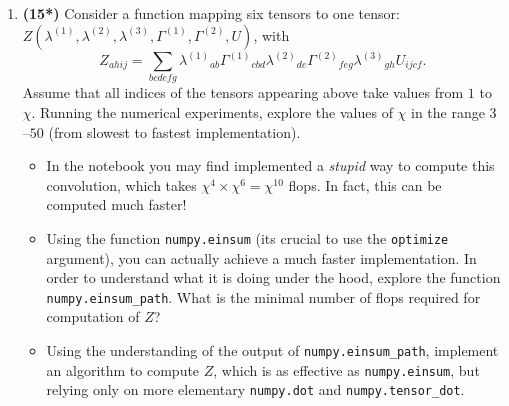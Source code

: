 \begin{enumerate}
\item \textbf{(15*)} Consider a function mapping six tensors to one tensor: $Z\left(\lambda^{(1)},\lambda^{(2)},\lambda^{(3)},\Gamma^{(1)}, \Gamma^{(2)}, U\right)$, with
\begin{equation}
Z_{ahij} = \sum_{bcdefg}\lambda^{(1)}{}_{ab}\Gamma^{(1)}{}_{cbd}\lambda^{(2)}{}_{de}\Gamma^{(2)}{}_{feg}\lambda^{(3)}{}_{gh}U_{ijcf}\label{eq:TEBD}.
\end{equation}
Assume that all indices of the tensors appearing above take values from $1$ to $\chi$. Running the numerical experiments, explore the values of $\chi$ in the range $3$--$50$ (from slowest to fastest implementation).
\begin{itemize}
    \item In the notebook  you may find implemented a \emph{stupid} way to compute this convolution, which takes $\chi^4\times \chi^{6} = \chi^{10}$ flops. In fact, this can be computed much faster!
    \item Using the function \texttt{numpy.einsum} (its crucial to use the \texttt{optimize} argument), you can actually achieve a much faster implementation. In order to understand what it is doing under the hood, explore the function \texttt{numpy.einsum\_path}. What is the minimal number of flops required for computation of $Z$?
    \item Using the understanding of the output of \texttt{numpy.einsum\_path}, implement an algorithm to compute $Z$, which is as effective as \texttt{numpy.einsum}, but relying only on more elementary \texttt{numpy.dot} and \texttt{numpy.tensor\_dot}.
\end{itemize}


\end{enumerate}

